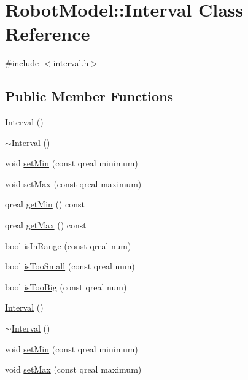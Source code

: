 \hypertarget{class_robot_model_1_1_interval}{
\section{RobotModel::Interval Class Reference}
\label{class_robot_model_1_1_interval}
}


{\ttfamily \#include $<$interval.h$>$}\subsection*{Public Member Functions}
\begin{DoxyCompactItemize}
\item 
\hyperlink{class_robot_model_1_1_interval_ae48b9a9e9f672f81977627b609e32429}{Interval} ()
\item 
\hyperlink{class_robot_model_1_1_interval_a923e1717a3dedfe1ba90f81fcb26d5c5}{$\sim$Interval} ()
\item 
void \hyperlink{class_robot_model_1_1_interval_a093471bdcba90e074543fb2781287145}{setMin} (const qreal minimum)
\item 
void \hyperlink{class_robot_model_1_1_interval_a7deeccee610088a7aebef94919fd6f36}{setMax} (const qreal maximum)
\item 
qreal \hyperlink{class_robot_model_1_1_interval_abb8aac06ae73b9dfc7c3caf3f8b56399}{getMin} () const 
\item 
qreal \hyperlink{class_robot_model_1_1_interval_a26857944f58e736ed0abdf534e2f56d8}{getMax} () const 
\item 
bool \hyperlink{class_robot_model_1_1_interval_a26125787902f3761e303ba3999d0eb71}{isInRange} (const qreal num)
\item 
bool \hyperlink{class_robot_model_1_1_interval_a15ffb7f16e3bad02073761ecd23d9695}{isTooSmall} (const qreal num)
\item 
bool \hyperlink{class_robot_model_1_1_interval_ae8da5063cbb210bdc856e30ea2b01f19}{isTooBig} (const qreal num)
\item 
\hyperlink{class_robot_model_1_1_interval_a84b5182a1624031b0793d938dcdfa63d}{Interval} ()
\item 
\hyperlink{class_robot_model_1_1_interval_a0bcaeeb61bc82c2d3e900786ebfe2bd9}{$\sim$Interval} ()
\item 
void \hyperlink{class_robot_model_1_1_interval_a70965c586d4e6e9d1c8d8d103de64165}{setMin} (const qreal minimum)
\item 
void \hyperlink{class_robot_model_1_1_interval_a91f49b3d27fda4b214d599508db7bf12}{setMax} (const qreal maximum)

\end{DoxyCompactItemize}
